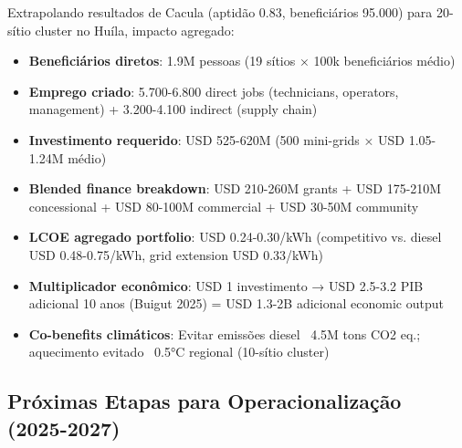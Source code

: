 \documentclass[12pt, a4paper]{article}
\begin{document}
Extrapolando resultados de Cacula (aptidão 0.83, beneficiários 95.000) para 20-sítio cluster no Huíla, impacto agregado:
\begin{itemize}
\item\textbf{Beneficiários diretos}: 1.9M pessoas (19 sítios × 100k beneficiários médio)
\item\textbf{Emprego criado}: 5.700-6.800 direct jobs (technicians, operators, management) + 3.200-4.100 indirect (supply chain)
\item\textbf{Investimento requerido}: USD 525-620M (500 mini-grids × USD 1.05-1.24M médio)
\item\textbf{Blended finance breakdown}: USD 210-260M grants + USD 175-210M concessional + USD 80-100M commercial + USD 30-50M community
\item\textbf{LCOE agregado portfolio}: USD 0.24-0.30/kWh (competitivo vs. diesel USD 0.48-0.75/kWh, grid extension USD 0.33/kWh)
\item\textbf{Multiplicador econômico}: USD 1 investimento → USD 2.5-3.2 PIB adicional 10 anos (Buigut 2025) = USD 1.3-2B adicional economic output
\item\textbf{Co-benefits climáticos}: Evitar emissões diesel ~4.5M tons CO2 eq.; aquecimento evitado ~0.5°C regional (10-sítio cluster)
\end{itemize}

\subsection{Próximas Etapas para Operacionalização (2025-2027)}
\end{document}
